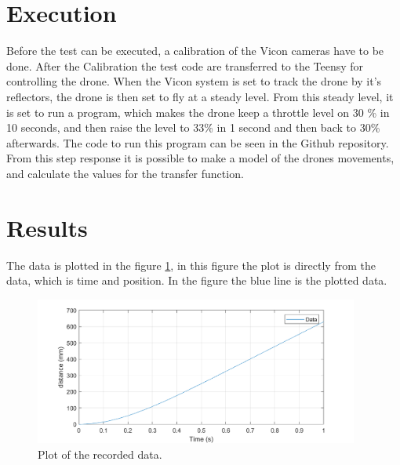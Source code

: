\section*{Execution}
Before the test can be executed, a calibration of the Vicon cameras have to be done. After the Calibration the test code are transferred to the Teensy for controlling the drone. When the Vicon system is set to track the drone by it's reflectors, the drone is then set to fly at a steady level. From this steady level, it is set to run a program, which makes the drone keep a throttle level on 30 \% in 10 seconds, and then raise the level to 33\% in 1 second and then back to 30\% afterwards. The code to run this program can be seen in the Github repository. From this step response it is possible to make a model of the drones movements, and calculate the values for the transfer function. 



\section*{Results}
The data is plotted in the figure \ref{fig:positiontime}, in this figure the plot is directly from the data, which is time and position. In the figure the blue line is the plotted data.

\begin{figure}[H]
    \centering
    \includegraphics[width=0.95\textwidth]{figures/Appendix/measuringTest/DroneTest.png}
    \caption{Plot of the recorded data.}
    \label{fig:positiontime}
\end{figure}

